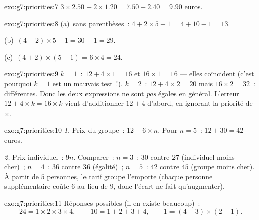 \begin{solution}{exo:g7:priorities:7}
$3 \times 2.50 + 2 \times 1.20 = 7.50 + 2.40 = 9.90$ euros.
\end{solution}

\begin{solution}{exo:g7:priorities:8}
(a)~sans parenthèses~: $4 + 2 \times 5 - 1 = 4 + 10 - 1 = 13$.

(b)~$(4 + 2) \times 5 - 1 = 30 - 1 = 29$.

(c)~$(4 + 2) \times (5 - 1) = 6 \times 4 = 24$.
\end{solution}

\begin{solution}{exo:g7:priorities:9}
$k = 1$~: $12 + 4 \times 1 = 16$ et $16 \times 1 = 16$ --- elles
coïncident (c'est pourquoi $k = 1$ est un mauvais test~!). $k = 2$~:
$12 + 4 \times 2 = 20$ mais $16 \times 2 = 32$~: différentes. Donc
les deux expressions ne sont \emph{pas} égales en général. L'erreur
$12 + 4 \times k = 16 \times k$ vient d'additionner $12 + 4$
d'abord, en ignorant la priorité de $\times$.
\end{solution}

\begin{solution}{exo:g7:priorities:10}
\emph{1.} Prix du groupe~: $12 + 6 \times n$. Pour $n = 5$~:
$12 + 30 = 42$ euros.

\emph{2.} Prix individuel~: $9n$. Comparer~: $n = 3$~: $30$ contre
$27$ (individuel moins cher)~; $n = 4$~: $36$ contre $36$ (égalité)~;
$n = 5$~: $42$ contre $45$ (groupe moins cher). À partir de $5$
personnes, le tarif groupe l'emporte (chaque personne
supplémentaire coûte $6$ au lieu de $9$, donc l'écart ne fait
qu'augmenter).
\end{solution}

\begin{solution}{exo:g7:priorities:11}
Réponses possibles (il en existe beaucoup)~:
\[
24 = 1 \times 2 \times 3 \times 4, \qquad
10 = 1 + 2 + 3 + 4, \qquad
1 = (4 - 3) \times (2 - 1).
\]
\end{solution}

